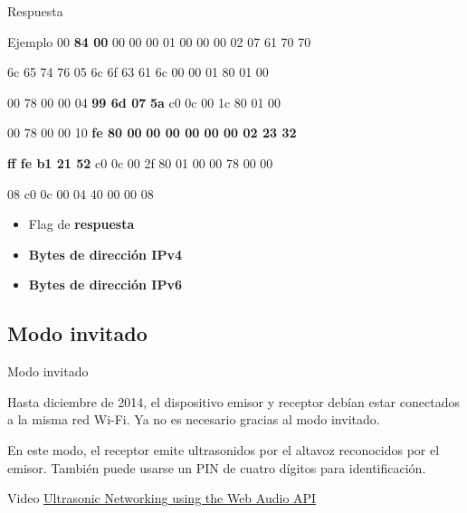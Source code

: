 \begin{frame}{Respuesta}
	\begin{exampleblock}{Ejemplo}
		 00 \textbf<2>{84 00} 00 00 00 01 \hspace{0.1cm} 00 00 00 02 07 61 70 70

		6c 65 74 76 05 6c 6f 63 \hspace{0.1cm} 61 6c 00 00 01 80 01 00

		00 78 00 00 04 \textbf<3>{99 6d 07} \hspace{0.1cm} \textbf<3>{5a} c0 0c 00 1c 80 01 00

		00 78 00 00 10 \textbf<4>{fe 80 00} \hspace{0.1cm} \textbf<4>{00 00 00 00 00 02 23 32}

		\textbf<4>{ff fe b1 21 52} c0 0c 00 \hspace{0.1cm} 2f 80 01 00 00 78 00 00

		08 c0 0c 00 04 40 00 00 \hspace{0.1cm} 08
	\end{exampleblock}

	\begin{itemize}
		\item Flag de \textbf<2>{respuesta}
		\item \textbf<3>{Bytes de dirección IPv4}
		\item \textbf<4>{Bytes de dirección IPv6}
	\end{itemize}
\end{frame}


\subsection{Modo invitado}
\begin{frame}{Modo invitado}
	\begin{block}{ }
		Hasta diciembre de 2014, el dispositivo emisor y receptor debían estar conectados a la misma red
		Wi-Fi. Ya no es necesario gracias al modo invitado.

		En este modo, el receptor emite ultrasonidos por el altavoz reconocidos por el emisor. También puede usarse un PIN de cuatro dígitos para identificación.
	\end{block}


	\begin{block}{Video}
	\href{https://www.youtube.com/watch?v=w6lRq5spQmc}{Ultrasonic Networking using the Web Audio API}
	\end{block}
\end{frame}



